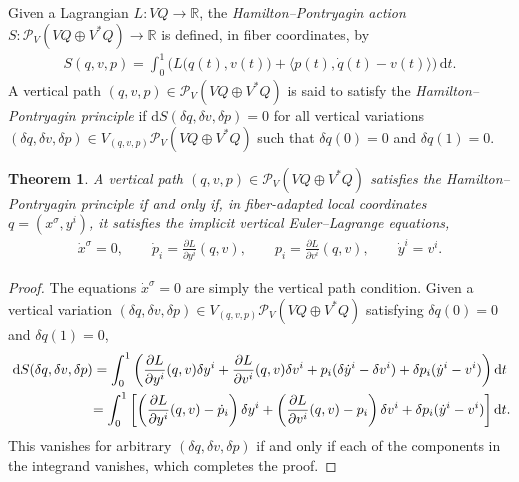 \documentclass[pdftex]{sigma}
\numberwithin{equation}{section}
\newtheorem{Theorem}{Theorem}[section]
\begin{document}
\begin{Definition}
Given a Lagrangian $ L \colon V Q \rightarrow \mathbb{R} $, the \emph{Hamilton--Pontryagin action} $ S \colon \mathcal{P} _V ( V Q \oplus V ^\ast Q ) \rightarrow \mathbb{R} $ is def\/ined, in f\/iber coordinates, by
 \begin{gather*}
 S (q, v, p) = \int _0 ^1 \bigl( L \bigl( q (t) , v (t) \bigr) + \bigl\langle p (t) , \dot{q} (t) - v (t) \bigr\rangle \bigr) \,\mathrm{d}t .
 \end{gather*}
 A vertical path $ ( q, v , p ) \in \mathcal{P} _V ( V Q \oplus V ^\ast Q ) $ is said to satisfy the \emph{Hamilton--Pontryagin principle} if $ \mathrm{d} S ( \delta q, \delta v , \delta p ) = 0 $ for all vertical variations $ ( \delta q, \delta v , \delta p ) \in V _{ ( q, v, p ) } \mathcal{P} _V ( V Q \oplus V ^\ast Q ) $ such that $ \delta q (0) = 0 $ and $ \delta q (1) = 0 $.
\end{Definition}

\begin{Theorem} A vertical path $ (q,v,p) \in \mathcal{P} _V ( V Q \oplus V ^\ast Q ) $ satisfies the Hamilton--Pontryagin principle if and only if, in fiber-adapted local coordinates $ q = ( x ^\sigma , y ^i ) $, it satisfies the \emph{implicit vertical Euler--Lagrange equations},
 \begin{gather} \label{eq:implicitVEL}
 \dot{x} ^\sigma = 0 , \qquad \dot{p} _i = \frac{ \partial L }{ \partial y ^i } ( q, v ) , \qquad p _i = \frac{ \partial L }{ \partial v ^i } ( q, v ) , \qquad \dot{y} ^i = v ^i .
\end{gather}
\end{Theorem}

\begin{proof} The equations $ \dot{x} ^\sigma = 0 $ are simply the vertical path condition. Given a vertical variation $ (\delta q, \delta v, \delta p ) \in V _{(q,v,p)} \mathcal{P} _V (V Q \oplus V ^\ast Q) $ satisfying $ \delta q (0) = 0 $ and $ \delta q (1) = 0 $,
 \begin{gather*}
 \mathrm{d} S ( \delta q, \delta v , \delta p ) = \int _0 ^1 \left( \frac{ \partial L }{ \partial y ^i } ( q, v ) \delta y ^i + \frac{ \partial L }{ \partial v ^i } ( q, v ) \delta v ^i + p _i ( \delta \dot{y} ^i - \delta v ^i ) + \delta p _i ( \dot{y} ^i - v ^i ) \right) \mathrm{d}t \\
\hphantom{\mathrm{d} S ( \delta q, \delta v , \delta p )}{} = \int _0 ^1 \left[ \left( \frac{ \partial
 L }{ \partial y ^i } ( q, v ) - \dot{p} _i \right) \delta y ^i + \left( \frac{ \partial L }{ \partial v ^i } ( q, v ) - p _i \right) \delta v ^i + \delta p _i ( \dot{y} ^i - v ^i ) \right] \mathrm{d}t .
 \end{gather*}
This vanishes for arbitrary $ ( \delta q, \delta v , \delta p ) $ if and only if each of the components in the integrand vanishes, which completes the proof.
\end{proof}
\end{document}
